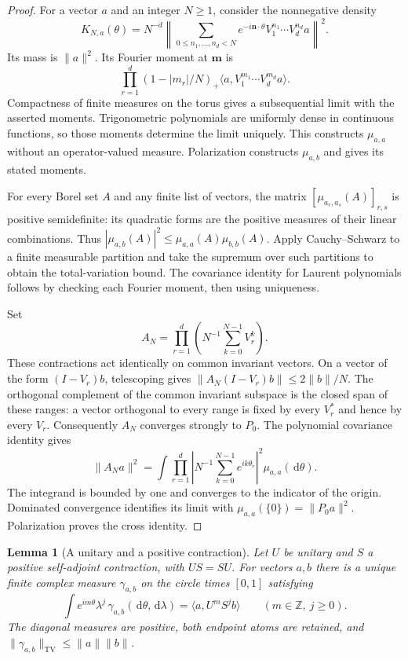 \documentclass[11pt]{article}
\newcommand{\Z}{\mathbb Z}
\newcommand{\dd}{\,\mathrm d}
\newcommand{\TV}{\mathrm{TV}}
\newtheorem{lemma}[theorem]{Lemma}
\theoremstyle{definition}
\theoremstyle{remark}
\numberwithin{equation}{section}
\begin{document}
\begin{proof}
For a vector $a$ and an integer $N\ge1$, consider the nonnegative density
\[
 K_{N,a}(\theta)=N^{-d}
 \left\|\sum_{0\le n_1,\ldots,n_d<N}
 e^{-i\mathbf n\cdot\theta}V_1^{n_1}\cdots V_d^{n_d}a\right\|^2.
\]
Its mass is $\|a\|^2$.  Its Fourier moment at $\mathbf m$ is
\[
 \prod_{r=1}^d(1-|m_r|/N)_+
       \langle a,V_1^{m_1}\cdots V_d^{m_d}a\rangle.
\]
Compactness of finite measures on the torus gives a subsequential
limit with the asserted moments.  Trigonometric polynomials are uniformly
dense in continuous functions, so those moments determine the limit
uniquely.  This constructs $\mu_{a,a}$ without an operator-valued measure.
Polarization constructs $\mu_{a,b}$ and gives its stated moments.

For every Borel set $A$ and any finite list of vectors, the matrix
$[\mu_{a_r,a_s}(A)]_{r,s}$ is positive semidefinite: its quadratic
forms are the positive measures of their linear combinations.
Thus $|\mu_{a,b}(A)|^2\le\mu_{a,a}(A)\mu_{b,b}(A)$.
Apply Cauchy--Schwarz to a finite measurable partition and take the
supremum over such partitions to obtain the total-variation bound.
The covariance identity for Laurent polynomials follows by checking
each Fourier moment, then using uniqueness.

Set
\[
 A_N=\prod_{r=1}^d\left(N^{-1}\sum_{k=0}^{N-1}V_r^k\right).
\]
These contractions act identically on common invariant vectors.
On a vector of the form $(I-V_r)b$, telescoping gives
$\|A_N(I-V_r)b\|\le2\|b\|/N$.
The orthogonal complement of the common invariant subspace is the
closed span of these ranges: a vector orthogonal to every range is
fixed by every $V_r^*$ and hence by every $V_r$.  Consequently $A_N$
converges strongly to $P_0$.  The polynomial covariance identity gives
\[
 \|A_Na\|^2
 =\int\prod_{r=1}^d\left|N^{-1}\sum_{k=0}^{N-1}e^{ik\theta_r}\right|^2
          \mu_{a,a}(\dd\theta).
\]
The integrand is bounded by one and converges to the indicator of the
origin.  Dominated convergence identifies its limit with
$\mu_{a,a}(\{0\})=\|P_0a\|^2$.  Polarization proves the cross identity.
\end{proof}

\begin{lemma}[A unitary and a positive contraction]\label{spectra:transfer}
Let $U$ be unitary and $S$ a positive self-adjoint contraction, with
$US=SU$.  For vectors $a,b$ there is a unique finite complex measure
$\gamma_{a,b}$ on the circle times $[0,1]$ satisfying
\[
 \int e^{im\theta}\lambda^j\,\gamma_{a,b}(\dd\theta,\dd\lambda)
    =\langle a,U^mS^jb\rangle
       \qquad(m\in\Z,\ j\ge0).
\]
The diagonal measures are positive, both endpoint atoms are retained,
and $\|\gamma_{a,b}\|_{\TV}\le\|a\|\|b\|$.
\end{lemma}
\end{document}
